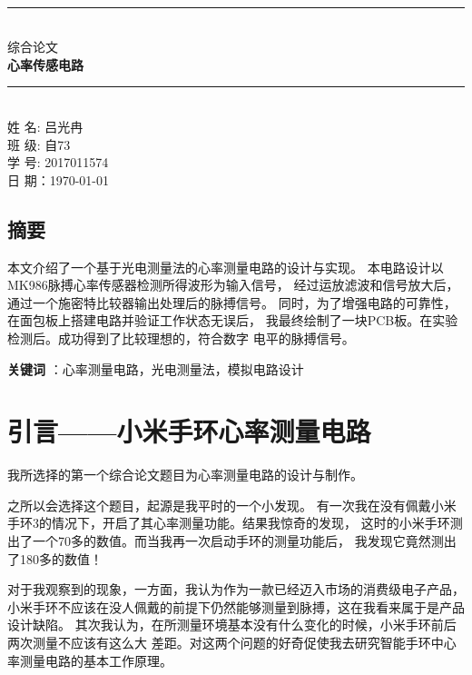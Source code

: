 \documentclass{article}
\begin{document}
\begin{spacing}{1.5}

    \thispagestyle{empty}
    \begin{center}
~\\[6cm]\rule{\linewidth}{0.5mm} \\[6mm]
{\Large 综合论文  \\  \textbf{{\LARGE 心率传感电路}}  \\[6mm]}
\rule{\linewidth}{0.5mm} \\[2cm]
{\Large 姓 名: 吕光冉}\\[.3cm]
{\Large 班 级:   自73 }\\[.3cm]
{\Large 学 号:  2017011574}\\[.3cm]
{\Large 日 期：\today }\\[.3cm]
    \end{center}

    \clearpage
    \phantom{s}

\tableofcontents
\newpage

    \subsection{摘要}

    本文介绍了一个基于光电测量法的心率测量电路的设计与实现。
    本电路设计以MK986脉搏心率传感器检测所得波形为输入信号，
    经过运放滤波和信号放大后，通过一个施密特比较器输出处理后的脉搏信号。
    同时，为了增强电路的可靠性，在面包板上搭建电路并验证工作状态无误后，
    我最终绘制了一块PCB板。在实验检测后。成功得到了比较理想的，符合数字
    电平的脉搏信号。

    \textbf{关键词} ：心率测量电路，光电测量法，模拟电路设计

\section{引言——小米手环心率测量电路}

   我所选择的第一个综合论文题目为心率测量电路的设计与制作。

   之所以会选择这个题目，起源是我平时的一个小发现。
   有一次我在没有佩戴小米手环3的情况下，开启了其心率测量功能。结果我惊奇的发现，
   这时的小米手环测出了一个70多的数值。而当我再一次启动手环的测量功能后，
   我发现它竟然测出了180多的数值！
   
   对于我观察到的现象，一方面，我认为作为一款已经迈入市场的消费级电子产品，
   小米手环不应该在没人佩戴的前提下仍然能够测量到脉搏，这在我看来属于是产品设计缺陷。
   其次我认为，在所测量环境基本没有什么变化的时候，小米手环前后两次测量不应该有这么大
   差距。对这两个问题的好奇促使我去研究智能手环中心率测量电路的基本工作原理。
    

\end{spacing}
\end{document}
